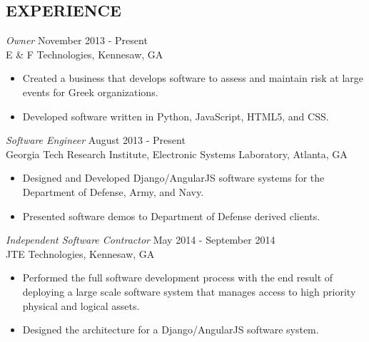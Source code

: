 \documentclass[margin, 10pt]{res} %
\begin{document}
\begin{resume}

      \section{EXPERIENCE}

      {\sl Owner} \hfill November 2013 - Present \\
      E \& F Technologies, Kennesaw, GA
      \begin{itemize}
      \item Created a business that develops software to assess and maintain risk at large events for Greek organizations.
      \item Developed software written in Python, JavaScript, HTML5, and CSS.
      \end{itemize}

      {\sl Software Engineer} \hfill August 2013 - Present \\
      Georgia Tech Research Institute, Electronic Systems Laboratory, Atlanta, GA
      \begin{itemize} \itemsep -2pt %
      \item Designed and Developed Django/AngularJS software systems for the Department of Defense, Army, and Navy.
      \item Presented software demos to Department of Defense derived clients.
      \end{itemize}

       {\sl Independent Software Contractor} \hfill May 2014 - September 2014\\
       JTE Technologies, Kennesaw, GA
       \begin{itemize}
       \item Performed the full software development process with the end result of deploying a large scale software system that manages access to high priority physical and logical assets.
       \item Designed the architecture for a Django/AngularJS software system.
       \end{itemize}




\end{resume}
\end{document}
